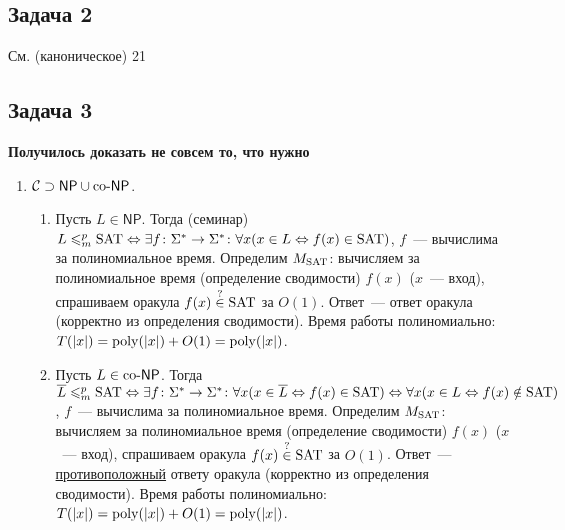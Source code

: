 \documentclass[a4paper]{article}
\def\C{{\cal C}}
\def\NP{{\mathsf{NP}}}
\def\coNP{{\rm co}\text{-}{\mathsf{NP}}}
\def\SAT{{\rm{SAT}}}
\def\poly{{\rm{poly}}}
\begin{document}
\subsection*{Задача 2}
См. (каноническое) 21
\newpage
\subsection*{Задача 3}
{\bf Получилось доказать не совсем то, что нужно}
\begin{enumerate}
\item $\C\supset \NP\cup\coNP$.\begin{enumerate}
\item Пусть $L\in\NP$. Тогда (семинар) $L\leqslant_m^p\SAT\Leftrightarrow \exists f\colon\Sigma^*\to\Sigma^*\colon\forall x(x\in L\Leftrightarrow f(x)\in\SAT)$, $f$~--- вычислима за полиномиальное время. Определим $M_{\SAT}$: вычисляем за полиномиальное время (определение сводимости) $f(x)$ ($x$~--- вход), спрашиваем оракула $f(x)\overset{?}{\in}\SAT$ за $O(1)$. Ответ~--- ответ оракула (корректно из определения сводимости).  Время работы полиномиально: $T(|x|)=\poly(|x|)+O(1)=\poly(|x|)$.
\item Пусть $L\in\coNP$. Тогда $\overline{L}\leqslant_m^p\SAT\Leftrightarrow \exists f\colon\Sigma^*\to\Sigma^*\colon\forall x(x\in \overline{L}\Leftrightarrow f(x)\in\SAT)\Leftrightarrow\forall x(x\in L\Leftrightarrow f(x)\notin\SAT)$, $f$~--- вычислима за полиномиальное время. Определим $M_{\SAT}$: вычисляем за полиномиальное время (определение сводимости) $f(x)$ ($x$~--- вход), спрашиваем оракула $f(x)\overset{?}{\in}\SAT$ за $O(1)$. Ответ~--- \underline{противоположный} ответу оракула (корректно из определения сводимости). Время работы полиномиально: $T(|x|)=\poly(|x|)+O(1)=\poly(|x|)$.

\end{enumerate}
\end{enumerate}
\end{document}
